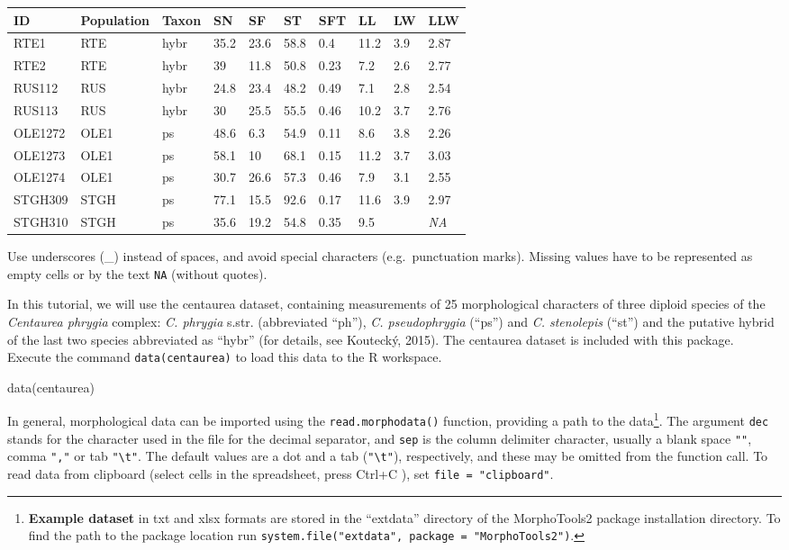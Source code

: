 \documentclass[
  11pt,
  a4paper]{article}
\newenvironment{Shaded}{\begin{snugshade}}{\end{snugshade}}
\newcommand{\FunctionTok}[1]{\textcolor[rgb]{0.00,0.00,0.00}{#1}}
\newcommand{\NormalTok}[1]{#1}
\begin{document}
\begin{longtable}[]{@{}llllllllll@{}}
\toprule
ID & Population & Taxon & SN & SF & ST & SFT & LL & LW & LLW \\
\midrule
\endhead
RTE1 & RTE & hybr & 35.2 & 23.6 & 58.8 & 0.4 & 11.2 & 3.9 & 2.87 \\
RTE2 & RTE & hybr & 39 & 11.8 & 50.8 & 0.23 & 7.2 & 2.6 & 2.77 \\
RUS112 & RUS & hybr & 24.8 & 23.4 & 48.2 & 0.49 & 7.1 & 2.8 & 2.54 \\
RUS113 & RUS & hybr & 30 & 25.5 & 55.5 & 0.46 & 10.2 & 3.7 & 2.76 \\
OLE1272 & OLE1 & ps & 48.6 & 6.3 & 54.9 & 0.11 & 8.6 & 3.8 & 2.26 \\
OLE1273 & OLE1 & ps & 58.1 & 10 & 68.1 & 0.15 & 11.2 & 3.7 & 3.03 \\
OLE1274 & OLE1 & ps & 30.7 & 26.6 & 57.3 & 0.46 & 7.9 & 3.1 & 2.55 \\
STGH309 & STGH & ps & 77.1 & 15.5 & 92.6 & 0.17 & 11.6 & 3.9 & 2.97 \\
STGH310 & STGH & ps & 35.6 & 19.2 & 54.8 & 0.35 & 9.5 & & \emph{NA} \\
\bottomrule
\end{longtable}

Use underscores (\_) instead of spaces, and avoid special characters
(e.g.~punctuation marks). Missing values have to be represented as empty
cells or by the text \texttt{NA} (without quotes).

In this tutorial, we will use the centaurea dataset, containing
measurements of 25 morphological characters of three diploid species of
the \emph{Centaurea phrygia} complex: \emph{C. phrygia} s.str.
(abbreviated ``ph''), \emph{C. pseudophrygia} (``ps'') and \emph{C.
stenolepis} (``st'') and the putative hybrid of the last two species
abbreviated as ``hybr'' (for details, see Koutecký, 2015). The centaurea
dataset is included with this package. Execute the command
\texttt{data(centaurea)} to load this data to the R workspace.

\begin{Shaded}
\begin{Highlighting}[]
\FunctionTok{data}\NormalTok{(centaurea)}
\end{Highlighting}
\end{Shaded}

In general, morphological data can be imported using the
\texttt{read.morphodata()} function, providing a path to the
data\footnote{\textbf{Example dataset} in txt and xlsx formats are
  stored in the ``extdata'' directory of the MorphoTools2 package
  installation directory. To find the path to the package location run
  \texttt{system.file("extdata",\ package\ =\ "MorphoTools2")}.}. The
argument \texttt{dec} stands for the character used in the file for the
decimal separator, and \texttt{sep} is the column delimiter character,
usually a blank space \texttt{""}, comma \texttt{","} or tab
\texttt{"\textbackslash{}t"}. The default values are a dot and a tab
(\texttt{"\textbackslash{}t"}), respectively, and these may be omitted
from the function call. To read data from clipboard (select cells in the
spreadsheet, press Ctrl+C ), set \texttt{file\ =\ "clipboard"}.
\end{document}
